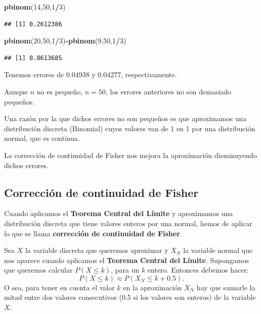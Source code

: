 \documentclass[]{book}
\newenvironment{Shaded}{\begin{snugshade}}{\end{snugshade}}
\newcommand{\DecValTok}[1]{\textcolor[rgb]{0.00,0.00,0.81}{#1}}
\newcommand{\KeywordTok}[1]{\textcolor[rgb]{0.13,0.29,0.53}{\textbf{#1}}}
\newcommand{\NormalTok}[1]{#1}
\newcommand{\OperatorTok}[1]{\textcolor[rgb]{0.81,0.36,0.00}{\textbf{#1}}}
\begin{document}
\begin{Shaded}
\begin{Highlighting}[]
\KeywordTok{pbinom}\NormalTok{(}\DecValTok{14}\NormalTok{,}\DecValTok{50}\NormalTok{,}\DecValTok{1}\OperatorTok{/}\DecValTok{3}\NormalTok{)}
\end{Highlighting}
\end{Shaded}

\begin{verbatim}
## [1] 0.2612386
\end{verbatim}

\begin{Shaded}
\begin{Highlighting}[]
\KeywordTok{pbinom}\NormalTok{(}\DecValTok{20}\NormalTok{,}\DecValTok{50}\NormalTok{,}\DecValTok{1}\OperatorTok{/}\DecValTok{3}\NormalTok{)}\OperatorTok{-}\KeywordTok{pbinom}\NormalTok{(}\DecValTok{9}\NormalTok{,}\DecValTok{50}\NormalTok{,}\DecValTok{1}\OperatorTok{/}\DecValTok{3}\NormalTok{)}
\end{Highlighting}
\end{Shaded}

\begin{verbatim}
## [1] 0.8613685
\end{verbatim}

Tenemos errores de 0.04938 y 0.04277, respectivamente.

Aunque \(n\) no es pequeño, \(n=50\), los errores anteriores no son demasiado pequeños.

Una razón por la que dichos errores no son pequeños es que aproximamos una distribución discreta (Binomial) cuyos valores van de 1 en 1 por una distribución normal, que es continua.

La corrección de continuidad de Fisher nos mejora la aproximación disminuyendo dichos errores.

\hypertarget{correcciuxf3n-de-continuidad-de-fisher}{%
\subsection{Corrección de continuidad de Fisher}\label{correcciuxf3n-de-continuidad-de-fisher}}

Cuando aplicamos el \textbf{Teorema Central del Límite} y aproximamos una distribución discreta que tiene valores enteros por una normal, hemos de aplicar lo que se llama \textbf{corrección de continuidad de Fisher}.

Sea \(X\) la variable discreta que queremos aproximar y \(X_N\) la variable normal que nos aparece cuando aplicamos el \textbf{Teorema Central del Límite}. Supongamos que queremos calcular \(P(X\leq k)\), para un \(k\) entero. Entonces debemos hacer:
\[
P(X\leq k)\approx P(X_N\leq k+0.5).
\]
O sea, para tener en cuenta el valor \(k\) en la aproximación \(X_N\) hay que sumarle la mitad entre dos valores consecutivos (0.5 si los valores son enteros) de la variable \(X\).
\end{document}
